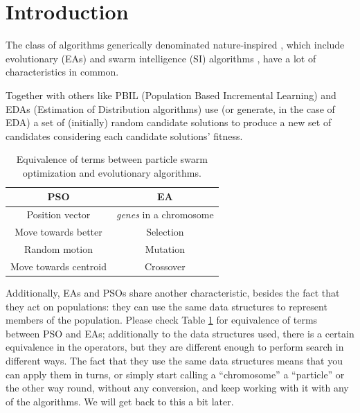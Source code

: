 \documentclass[runningheads]{llncs}
\begin{document}
\section{Introduction}


The class of algorithms generically denominated nature-inspired
\cite{yang2014nature}, which  include evolutionary (EAs) and swarm
intelligence (SI) algorithms
\cite{back1996evolutionary,kennedy2006swarm}, have a lot of
characteristics in common.


Together with others like PBIL (Population Based Incremental Learning)
\cite{baluja1994population} and EDAs (Estimation of Distribution
algorithms) \cite{larranaga2001estimation} use (or generate, in the
case of EDA) a set of (initially) random candidate solutions to
produce a new set of candidates considering each candidate solutions'
fitness.

\begin{table}[h!tb]
    \caption{Equivalence of terms between particle swarm optimization
    and evolutionary algorithms. \label{tab:equivalence}}
\centering
\begin{tabular}{|c|c|}
  \hline
  PSO & EA \\ \hline
  Position vector & {\em genes} in a chromosome \\ \hline
  Move towards better & Selection  \\ \hline
  Random motion & Mutation \\ \hline
  Move towards centroid & Crossover \\ \hline
\end{tabular}
\end{table}
%
Additionally, EAs and PSOs share another characteristic, besides the fact that they
act on populations: they can use the same data structures to
represent  members of the population. Please check Table
\ref{tab:equivalence} for equivalence of terms between PSO and EAs;
additionally to the data structures used, there is a certain
equivalence in the operators, but they are different enough to perform
search in different ways. The fact that they use the same data
structures means that you can apply them in turns, or simply start
calling a ``chromosome'' a ``particle'' or the other way round,
without any conversion, and keep working with it with any of the
algorithms. We will get back to this a bit later.
\end{document}
